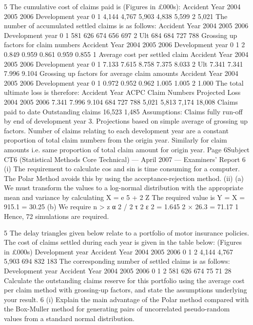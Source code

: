 \documentclass[a4paper,12pt]{article}
\begin{document}
\begin{enumerate}

5
The cumulative cost of claims paid is (Figures in £000s):
Accident Year
2004
2005
2006
Development year
0
1
4,144
4,767
5,903
4,838
5,599
2
5,021
The number of accumulated settled claims is as follows:
Accident Year
2004
2005
2006
Development year
0
1
581
626
674
656
697
2 Ult
684 684
727
788
Grossing up factors for claim numbers
Accident Year
2004
2005
2006
Development year
0
1
2
0.849 0.959
0.861 0.959
0.855
1
Average cost per settled claim
Accident Year
2004
2005
2006
Development year
0
1
7.133
7.615
8.758
7.375
8.033
2 Ult
7.341 7.341
7.996
9.104
Grossing up factors for average claim amounts
Accident Year
2004
2005
2006
Development year
0
1
0.972
0.952
0.962
1.005
1.005
2
1.000
The total ultimate loss is therefore:
Accident Year ACPC Claim
Numbers Projected
Loss
2004
2005
2006 7.341
7.996
9.104 684
727
788 5,021
5,813
7,174
18,008
Claims paid to date
Outstanding claims
16,523
1,485
Assumptions:
Claims fully run-off by end of development year 3.
Projections based on simple average of grossing up factors.
Number of claims relating to each development year are a constant proportion of total
claim numbers from the origin year.
Similarly for claim amounts i.e. same proportion of total claim amount for origin year.
Page 6Subject CT6 (Statistical Methods Core Technical) — April 2007 — Examiners’ Report
6
(i) The requirement to calculate cos and sin is time consuming for a computer.
The Polar Method avoids this by using the acceptance-rejection method.
(ii) (a)
We must transform the values to a log-normal distribution with the
appropriate mean and variance by calculating
X = e 5 + 2 Z
The required value is Y = X = 915.1 = 30.25
(b)
We require n >
z α 2 / 2 τ 2
ε 2
=
1.645 2 × 26.3
= 71.17
1
Hence, 72 simulations are required.


5
The delay triangles given below relate to a portfolio of motor insurance policies.
The cost of claims settled during each year is given in the table below:
(Figures in £000s)
Development year
Accident
Year
2004
2005
2006
0 1 2
4,144
4,767
5,903 694
832 183
The corresponding number of settled claims is as follows:
Development year
Accident
Year
2004
2005
2006
0 1 2
581
626
674 75
71 28
Calculate the outstanding claims reserve for this portfolio using the average cost per claim method with grossing-up factors, and state the assumptions underlying your result.
6
(i) Explain the main advantage of the Polar method compared with the Box-Muller method for generating pairs of uncorrelated pseudo-random values from a standard normal distribution.


\end{enumerate}
\end{document}
